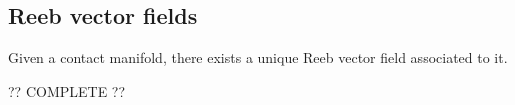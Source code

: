 \subsection{Reeb vector fields}

    \begin{property}
        Given a contact manifold, there exists a unique Reeb vector field associated to it.
    \end{property}

    ?? COMPLETE ??